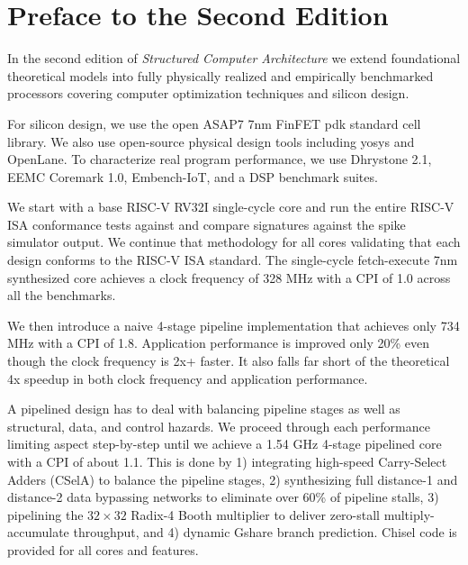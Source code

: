 \documentclass[11pt]{book}
\begin{document}

\chapter*{Preface to the Second Edition}

In the second edition of \emph{Structured Computer Architecture} we extend foundational theoretical models into fully physically realized and empirically benchmarked processors covering computer optimization techniques and silicon design.

For silicon design, we use the open ASAP7 7nm FinFET pdk standard cell library. We also use open-source physical design tools including yosys and OpenLane. To characterize real program performance, we use Dhrystone 2.1, EEMC Coremark 1.0, Embench-IoT, and a DSP benchmark suites.

We start with a base RISC-V RV32I single-cycle core and run the entire RISC-V ISA conformance tests against and compare signatures against the spike simulator output. We continue that methodology for all cores validating that each design conforms to the RISC-V ISA standard. The single-cycle fetch-execute 7nm synthesized core achieves a clock frequency of 328 MHz with a CPI of 1.0 across all the benchmarks. 

We then introduce a naive 4-stage pipeline implementation that achieves only 734 MHz with a CPI of 1.8. Application performance is improved only 20\% even though the clock frequency is 2x+ faster. It also falls far short of the theoretical 4x speedup in both clock frequency and application performance. 

A pipelined design has to deal with balancing pipeline stages as well as structural, data, and control hazards. We proceed through each performance limiting aspect step-by-step until we achieve a 1.54 GHz 4-stage pipelined core with a CPI of about 1.1. This is done by 1) integrating high-speed Carry-Select Adders (CSelA) to balance the pipeline stages, 2) synthesizing full distance-1 and distance-2 data bypassing networks to eliminate over 60\% of pipeline stalls, 3) pipelining the $32\times 32$ Radix-4 Booth multiplier to deliver zero-stall multiply-accumulate throughput, and 4) dynamic Gshare branch prediction. Chisel code is provided for all cores and features.
\end{document}
